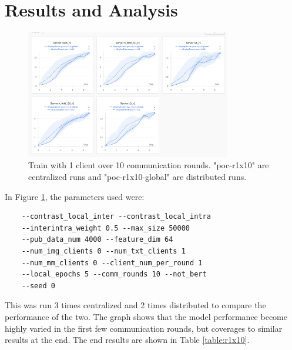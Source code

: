 \documentclass{article}
\begin{document}
\section{Results and Analysis}

\begin{figure}[ht]
    \centering
    \includegraphics[width=0.8\textwidth]{poc-r1x10.png}
    \caption{Train with 1 client over 10 communication rounds. "poc-r1x10" are centralized runs and "poc-r1x10-global" are distributed runs.}
    \label{fig:r1x10}
\end{figure}

In Figure \ref{fig:r1x10}, the parameters used were: 
\begin{lstlisting}
    --contrast_local_inter --contrast_local_intra 
    --interintra_weight 0.5 --max_size 50000 
    --pub_data_num 4000 --feature_dim 64 
    --num_img_clients 0 --num_txt_clients 1 
    --num_mm_clients 0 --client_num_per_round 1 
    --local_epochs 5 --comm_rounds 10 --not_bert 
    --seed 0
\end{lstlisting}

This was run 3 times centralized and 2 times distributed to compare the performance of the two. The graph shows that the model performance become highly varied in the first few communication rounds, but coverages to similar results at the end. The end results are shown in Table \ref{table:r1x10}.
\end{document}

